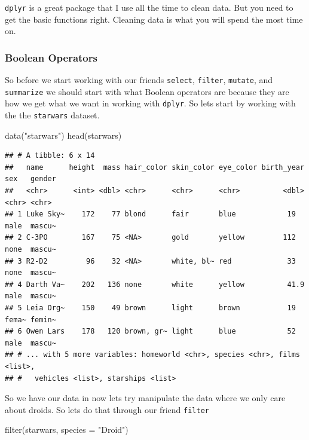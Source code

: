 \documentclass[]{tufte-handout}
\newenvironment{Shaded}{}{}
\newcommand{\AttributeTok}[1]{\textcolor[rgb]{0.49,0.56,0.16}{#1}}
\newcommand{\FunctionTok}[1]{\textcolor[rgb]{0.02,0.16,0.49}{#1}}
\newcommand{\NormalTok}[1]{#1}
\newcommand{\StringTok}[1]{\textcolor[rgb]{0.25,0.44,0.63}{#1}}
\begin{document}
\texttt{dplyr} is a great package that I use all the time to clean data.
But you need to get the basic functions right. Cleaning data is what you
will spend the most time on.

\hypertarget{boolean-operators}{%
\subsubsection{Boolean Operators}\label{boolean-operators}}

So before we start working with our friends \texttt{select},
\texttt{filter}, \texttt{mutate}, and \texttt{summarize} we should start
with what Boolean operators are because they are how we get what we want
in working with \texttt{dplyr}. So lets start by working with the the
\texttt{starwars} dataset.

\begin{Shaded}
\begin{Highlighting}[]
\FunctionTok{data}\NormalTok{(}\StringTok{"starwars"}\NormalTok{)}
\FunctionTok{head}\NormalTok{(starwars)}
\end{Highlighting}
\end{Shaded}

\begin{verbatim}
## # A tibble: 6 x 14
##   name      height  mass hair_color skin_color eye_color birth_year sex   gender
##   <chr>      <int> <dbl> <chr>      <chr>      <chr>          <dbl> <chr> <chr> 
## 1 Luke Sky~    172    77 blond      fair       blue            19   male  mascu~
## 2 C-3PO        167    75 <NA>       gold       yellow         112   none  mascu~
## 3 R2-D2         96    32 <NA>       white, bl~ red             33   none  mascu~
## 4 Darth Va~    202   136 none       white      yellow          41.9 male  mascu~
## 5 Leia Org~    150    49 brown      light      brown           19   fema~ femin~
## 6 Owen Lars    178   120 brown, gr~ light      blue            52   male  mascu~
## # ... with 5 more variables: homeworld <chr>, species <chr>, films <list>,
## #   vehicles <list>, starships <list>
\end{verbatim}

So we have our data in now lets try manipulate the data where we only
care about droids. So lets do that through our friend \texttt{filter}

\begin{Shaded}
\begin{Highlighting}[]
\FunctionTok{filter}\NormalTok{(starwars, }\AttributeTok{species =} \StringTok{"Droid"}\NormalTok{)}
\end{Highlighting}
\end{Shaded}
\end{document}
